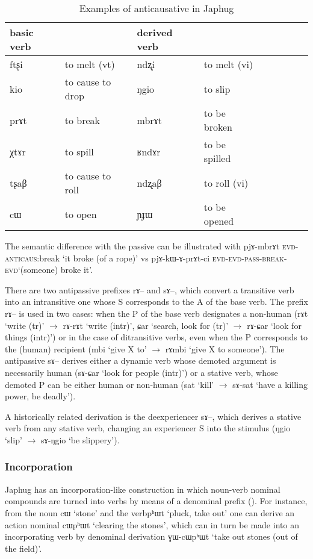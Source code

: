 \documentclass[oldfontcommands,oneside,a4paper,11pt]{article}
\newcommand{\ipa}[1]{{\phon #1}} %
\begin{document}
\begin{table}[H]
\caption{Examples of anticausative in Japhug}\label{tab:anticausative}
\begin{tabular}{lllllllll} \toprule
basic verb  & &derived  verb &\\
\midrule
\ipa{ftʂi}  &	to melt (vt)	&		\ipa{ndʐi}  &	to melt (vi)		\\
\ipa{kio}  &	to cause to drop	&		\ipa{ŋgio}  &	to slip		\\
\ipa{prɤt}  &	to break	&		\ipa{mbrɤt}  &		to be broken	\\
\ipa{χtɤr}  &	 to spill	&		\ipa{ʁndɤr}  &		to be spilled	\\
\ipa{tʂaβ}  &	to cause to roll	&		\ipa{ndʐaβ}  &	to roll (vi)		\\
   \ipa{cɯ}  &	 to open 	&		\ipa{ɲɟɯ}  &	 to be opened	 	\\ 
 \bottomrule
\end{tabular}
\end{table}

The semantic difference with the passive can be illustrated with \ipa{pjɤ-mbrɤt} \textsc{evd-anticaus}:break `it broke (of a rope)' vs \ipa{pjɤ-kɯ-ɤ-prɤt-ci} \textsc{evd-evd-pass-break}-\textsc{evd}`(someone) broke it'.

There are two antipassive prefixes \ipa{rɤ--} and \ipa{sɤ--}, which convert a transitive verb into an intransitive one whose S corresponds to the A of the base verb. The prefix \ipa{rɤ--} is used in two cases: when the P of the base verb designates a non-human (\ipa{rɤt} `write (tr)' $\rightarrow$ \ipa{rɤ-rɤt} `write (intr)', \ipa{ɕar} `search, look for (tr)' $\rightarrow$ \ipa{rɤ-ɕar} `look for things (intr)') or in the case of ditransitive verbs, even when the P corresponds to the (human) recipient (\ipa{mbi} `give X to' $\rightarrow$ \ipa{rɤmbi} `give X to someone'). The antipassive \ipa{sɤ--} derives either a dynamic verb whose demoted argument is necessarily human (\ipa{sɤ-ɕar} `look for people (intr)') or a stative verb, whose demoted P can be either human or non-human (\ipa{sat} `kill' $\rightarrow$ \ipa{sɤ-sat} `have a killing power, be deadly'). 

A historically related derivation is the deexperiencer \ipa{sɤ--}, which derives a stative verb from any stative verb, changing an experiencer S into the stimulus (\ipa{ŋgio} `slip' $\rightarrow$ \ipa{sɤ-ŋgio} `be slippery').

\subsubsection{Incorporation}
Japhug has an incorporation-like construction in which noun-verb nominal compounds are turned into verbs by means of a denominal prefix (\citealt{jacques12incorp}). For instance, from the noun \ipa{cɯ} `stone' and the verb\ipa{pʰɯt} `pluck, take out' one can derive an action nominal    \ipa{cɯpʰɯt} `clearing the stones', which can in turn be made into an incorporating verb by denominal derivation  \ipa{ɣɯ-cɯpʰɯt } `take out stones (out of the field)'.
\end{document}
